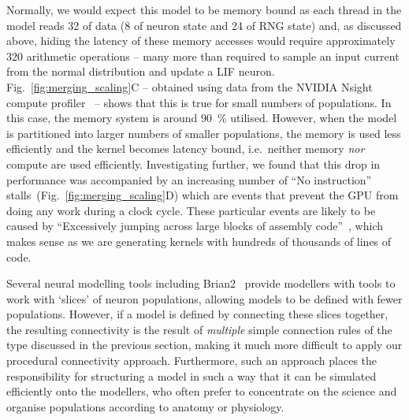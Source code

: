 \documentclass[9pt,a4paper]{amsart}
\newcommand{\todo}[1]{\textbf{\textsc{\textcolor{red}{(TODO: #1)}}}}
\begin{document}
%
Normally, we would expect this model to be memory bound as each thread in the model reads \SI{32}{\byte} of data (\SI{8}{\byte} of neuron state and \SI{24}{\byte} of RNG state) and, as discussed above, hiding the latency of these memory accesses would require approximately 320 arithmetic operations -- many more than required to sample an input current from the normal distribution and update a LIF neuron.
Fig.~\ref{fig:merging_scaling}C -- obtained using data from the NVIDIA Nsight compute profiler~\citep{NVIDIACorporation2020} -- shows that this is true for small numbers of populations.
In this case, the memory system is around \SI{90}{\percent} utilised.
However, when the model is partitioned into larger numbers of smaller populations, the memory is used less efficiently and the kernel becomes latency bound, i.e.~neither memory \emph{nor} compute are used efficiently.
Investigating further, we found that this drop in performance was accompanied by an increasing number of ``No instruction'' stalls~(Fig.~\ref{fig:merging_scaling}D) which are events that prevent the GPU from doing any work during a clock cycle.
These particular events are likely to be caused by ``Excessively jumping across large blocks of assembly code''~\citep[p47]{NVIDIACorporation2020}, which makes sense as we are generating kernels with hundreds of thousands of lines of code.

Several neural modelling tools including Brian2~\citep{Stimberg2019} provide modellers with tools to work with `slices' of neuron populations, allowing models to be defined with fewer populations.
However, if a model is defined by connecting these slices together, the resulting connectivity is the result of \emph{multiple} simple connection rules of the type discussed in the previous section, making it much more difficult to apply our procedural connectivity approach.
Furthermore, such an approach places the responsibility for structuring a model in such a way that it can be simulated efficiently onto the modellers, who often prefer to concentrate on the science and organise populations according to anatomy or physiology.
\end{document}
